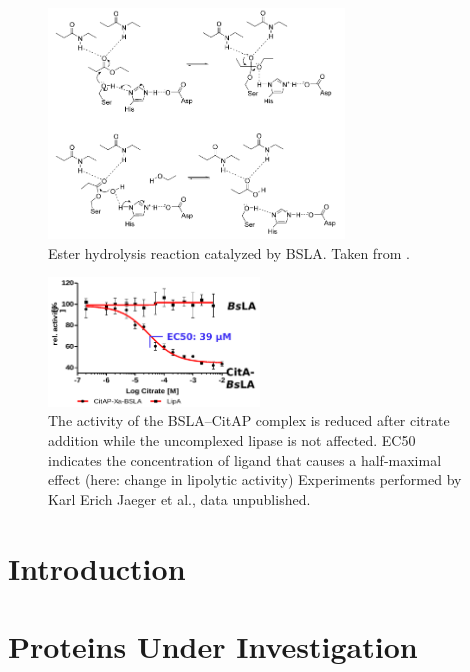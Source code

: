 \documentclass[english, a4paper, 12pt, titlepage, draft]{article}
\begin{document}

\onehalfspacing

\begin{figure}
    \centering
    \includegraphics[width=0.7\textwidth]{figures/BSLA_reaction.png}
    \caption{Ester hydrolysis reaction catalyzed by BSLA. Taken from \cite{BSLA_reaction}.}
    \label{fig:BSLAreaction}
\end{figure}  
 
\begin{figure}
    \centering
    \includegraphics[width=0.5\textwidth]{figures/BSLA_activity/BSLA_activity.png}
    \caption{The activity of the BSLA--CitAP complex is reduced after citrate addition while the uncomplexed lipase is not affected.
    EC50 indicates the concentration of ligand that causes a half-maximal effect (here: change in lipolytic activity)
    Experiments performed by Karl Erich Jaeger et al., data unpublished.}   
    \label{fig:BSLAactivity}
\end{figure} 


\section{Introduction}
\section{Proteins Under Investigation}
\end{document}
